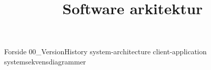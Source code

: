 \documentclass[a4paper,openany]{memoir}
\title{Software arkitektur}
\begin{document}
	{Forside}  \newpage
	\tableofcontents\thispagestyle{fancy}
	{00_VersionHistory}  \newpage
	{system-architecture}  \newpage
	{client-application}  \newpage
	{systemsekvensdiagrammer}  \newpage

	
	 {}
	\printbibliography
\end{document}

